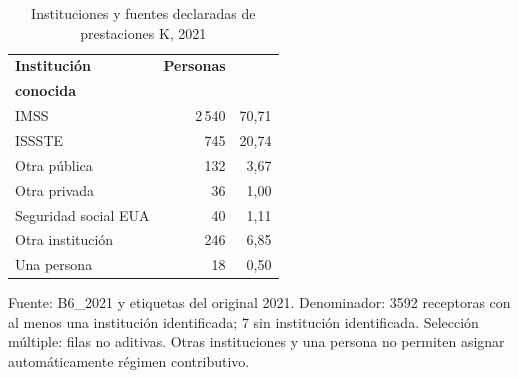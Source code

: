 \begin{table}[!htbp]
\centering
\caption{Instituciones y fuentes declaradas de prestaciones K, 2021}\label{tab:exploracion-instituciones}
\small\setlength{\tabcolsep}{4pt}
\renewcommand{\arraystretch}{1.15}
\begin{tabular}{lrr}
\toprule
\textbf{Institución} & \textbf{Personas} & \shortstack[c]{\textbf{\% institución}\\\textbf{conocida}} \\
\midrule
IMSS & 2\,540 & 70,71 \\
ISSSTE & 745 & 20,74 \\
Otra pública & 132 & 3,67 \\
Otra privada & 36 & 1,00 \\
Seguridad social EUA & 40 & 1,11 \\
Otra institución & 246 & 6,85 \\
Una persona & 18 & 0,50 \\
\bottomrule
\end{tabular}
\par\medskip
\parbox{\linewidth}{\footnotesize Fuente: B6\_2021 y etiquetas del original 2021. Denominador: 3592 receptoras con al menos una institución identificada; 7 sin institución identificada. Selección múltiple: filas no aditivas. Otras instituciones y una persona no permiten asignar automáticamente régimen contributivo.}
\end{table}
